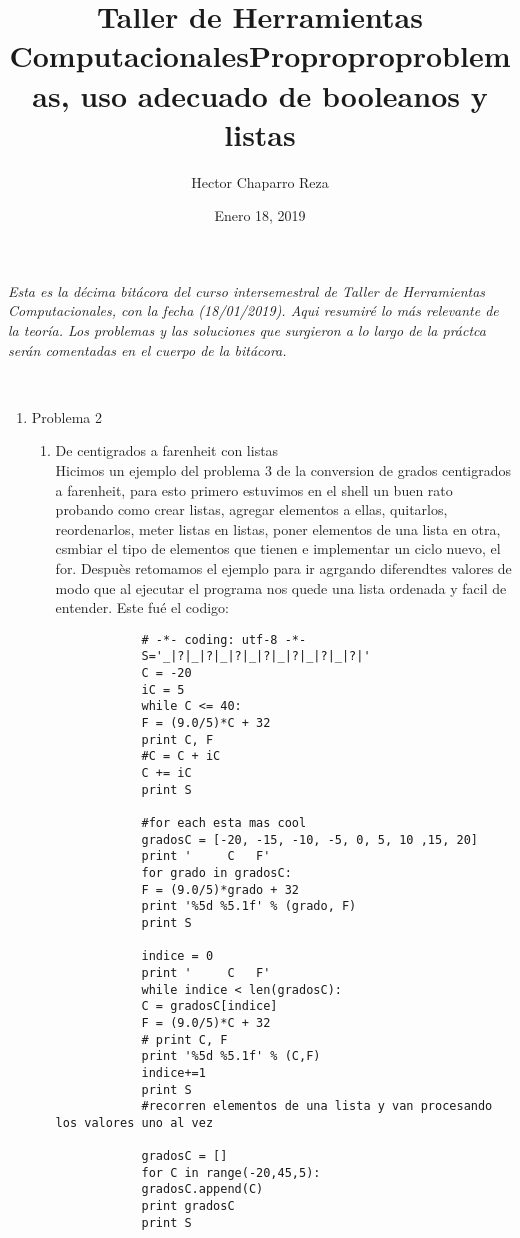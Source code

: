 \documentclass[letterpaper, 12pt, oneside]{article}
\title{\Huge{Taller de Herramientas Computacionales}}
\author{Hector Chaparro Reza}
\date{Enero 18, 2019}
\begin{document}
	\maketitle
	\it Esta es la décima bit\'acora del curso intersemestral de Taller de Herramientas Computacionales, con la fecha (18/01/2019). Aqui resumir\'e lo m\'as relevante de la teor\'ia. Los problemas y las soluciones que surgieron a lo largo de la pr\'actca ser\'an comentadas en el cuerpo de la bit\'acora.\\
	\newpage
	
	
	\title{\Huge{Proproproproblemas, uso adecuado de booleanos y listas}}\\
	
	\begin{enumerate}
		\item {Problema 2}
		\begin{enumerate}
			\item De centigrados a farenheit con listas\\
			Hicimos un ejemplo del problema 3 de la conversion de grados centigrados a farenheit, para esto primero estuvimos en el shell un buen rato probando como crear listas, agregar elementos a ellas, quitarlos, reordenarlos, meter listas en listas, poner elementos de una lista en otra, csmbiar el tipo de elementos que tienen e implementar un ciclo nuevo, el for. Despuès retomamos el ejemplo para ir agrgando diferendtes valores de modo que al ejecutar el programa nos quede una lista ordenada y facil de entender. Este fué el codigo:\\
			
			\begin{verbatim}
			# -*- coding: utf-8 -*-
			S='_|?|_|?|_|?|_|?|_|?|_|?|_|?|'
			C = -20
			iC = 5
			while C <= 40:
			F = (9.0/5)*C + 32
			print C, F
			#C = C + iC
			C += iC
			print S
			
			#for each esta mas cool
			gradosC = [-20, -15, -10, -5, 0, 5, 10 ,15, 20]
			print '     C   F'
			for grado in gradosC:
			F = (9.0/5)*grado + 32
			print '%5d %5.1f' % (grado, F)
			print S
			
			indice = 0
			print '     C   F'
			while indice < len(gradosC):
			C = gradosC[indice]
			F = (9.0/5)*C + 32
			# print C, F
			print '%5d %5.1f' % (C,F)
			indice+=1
			print S
			#recorren elementos de una lista y van procesando los valores uno al vez
			
			gradosC = []
			for C in range(-20,45,5):
			gradosC.append(C)
			print gradosC
			print S
			

\end{verbatim}
\end{enumerate}
\end{enumerate}
\end{document}
